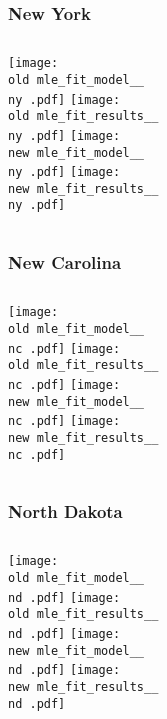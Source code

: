 \documentclass{beamer}
\newcommand{\old}{api-370-prod/pyseir/state_summaries/reports/}
\newcommand{\new}{new/pyseir/state_summaries/reports/}
\newcommand{\ny}{New York__36}
\newcommand{\nc}{North Carolina__37}
\newcommand{\nd}{North Dakota__38}
\begin{document}
\begin{frame}
\frametitle{New York}
    \begin{columns}[t]

       \texttt{[image: \\old mle\_fit\_model\_\_\\ny .pdf]}
       \texttt{[image: \\old mle\_fit\_results\_\_\\ny .pdf]}   
       \texttt{[image: \\new mle\_fit\_model\_\_\\ny .pdf]}
       \texttt{[image: \\new mle\_fit\_results\_\_\\ny .pdf]}   
\end{columns}
\end{frame}

\begin{frame}
\frametitle{New Carolina}
    \begin{columns}[t]

       \texttt{[image: \\old mle\_fit\_model\_\_\\nc .pdf]}
       \texttt{[image: \\old mle\_fit\_results\_\_\\nc .pdf]}   
       \texttt{[image: \\new mle\_fit\_model\_\_\\nc .pdf]}
       \texttt{[image: \\new mle\_fit\_results\_\_\\nc .pdf]}   
\end{columns}
\end{frame}

\begin{frame}
\frametitle{North Dakota}
    \begin{columns}[t]

       \texttt{[image: \\old mle\_fit\_model\_\_\\nd .pdf]}
       \texttt{[image: \\old mle\_fit\_results\_\_\\nd .pdf]}   
       \texttt{[image: \\new mle\_fit\_model\_\_\\nd .pdf]}
       \texttt{[image: \\new mle\_fit\_results\_\_\\nd .pdf]}   
\end{columns}
\end{frame}
\end{document}
